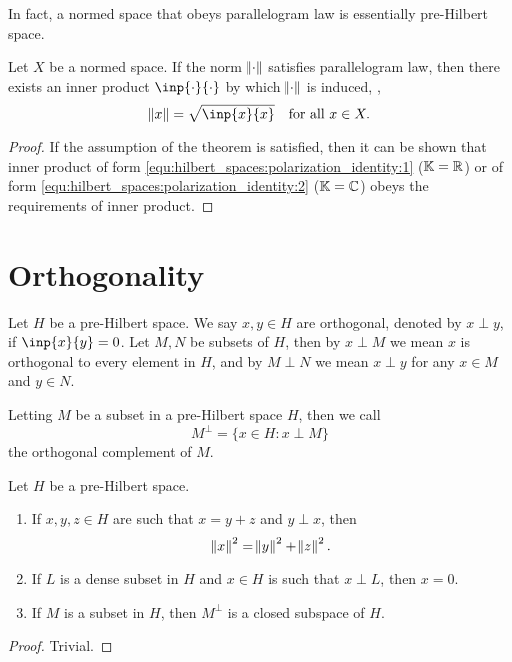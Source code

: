 In fact, a normed space that obeys parallelogram law is essentially 
pre-Hilbert space. 
\begin{thm}
Let $X$ be a normed space. 
If the norm $\norm{\mathord{\cdot}}$ satisfies parallelogram law, then there exists an 
inner product $\inp{\wdot}{\wdot}$ by which $\norm{\mathord{\cdot}}$ is induced, \ie, 
\begin{equation*}
    \norm{x} = \sqrt{\inp{x}{x}} \quad
    \text{for all } x \in X. 
\end{equation*}
\end{thm}
\begin{proof}
If the assumption of the theorem is satisfied, then it can be shown that 
inner product of form \ref{equ:hilbert_spaces:polarization_identity:1} 
($\mathbb{K} = \mathbb{R}$) or of form \ref{equ:hilbert_spaces:polarization_identity:2} 
($\mathbb{K} = \mathbb{C}$) obeys the requirements of inner product. 
\end{proof}

\section{Orthogonality}
\begin{defn}[Orthogonal]
Let $H$ be a pre-Hilbert space. 
We say $x, y \in H$ are orthogonal, denoted by $x \perp y$, if $\inp{x}{y} 
= 0$. 
Let $M, N$ be subsets of $H$, then by $x \perp M$ we mean $x$ is orthogonal 
to every element in $H$, and by $M \perp N$ we mean $x \perp y$ for any 
$x \in M$ and $y \in N$. 
\end{defn}

Letting $M$ be a subset in a pre-Hilbert space $H$, then we call 
\begin{equation*}
    M^\perp = \{x \in H: x \perp M\}
\end{equation*}
the orthogonal complement of $M$. 

\begin{thm}
Let $H$ be a pre-Hilbert space. 
\begin{enumerate}
    \item If $x, y, z \in H$ are such that $x = y + z$ and $y \perp x$, then 
    \begin{equation*}
        \norm{x}^2 = \norm{y}^2 + \norm{z}^2. 
    \end{equation*}
    \item If $L$ is a dense subset in $H$ and $x \in H$ is such that 
    $x \perp L$, then $x = 0$. 
    \item If $M$ is a subset in $H$, then $M ^\perp$ is a closed subspace 
    of $H$. 
\end{enumerate}
\end{thm}
\begin{proof}
Trivial. 
\end{proof}

